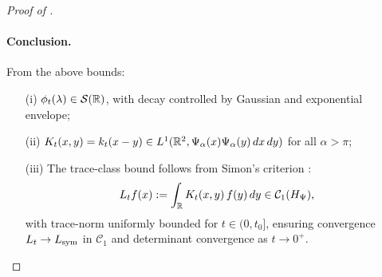 \begin{proof}[Proof of ]
\paragraph{Conclusion.}
From the above bounds:
\begin{itemize}
    \item[\textup{(i)}] \( \phi_t(\lambda) \in \mathcal{S}(\mathbb{R}) \), with decay controlled by Gaussian and exponential envelope;
    \item[\textup{(ii)}] \( K_t(x,y) = k_t(x - y) \in L^1(\mathbb{R}^2, \Psi_\alpha(x)\Psi_\alpha(y)\, dx\,dy) \) for all \( \alpha > \pi \);
    \item[\textup{(iii)}] The trace-class bound follows from Simon's criterion \cite[Thm.~4.2]{Simon2005TraceIdeals}:
    \[
    L_t f(x) := \int_{\mathbb{R}} K_t(x,y)\, f(y)\, dy \in \mathcal{C}_1(H_{\Psi}),
    \]
    with trace-norm uniformly bounded for \( t \in (0, t_0] \), ensuring convergence \( L_t \to L_{\mathrm{sym}} \) in \( \mathcal{C}_1 \) and determinant convergence as \( t \to 0^+ \).
\end{itemize}
\end{proof}
